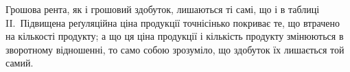 
Грошова рента, як і грошовий здобуток, лишаються ті самі, що і в таблиці II.~Підвищена реґуляційна ціна продукції точнісінько покриває те, що втрачено
на кількості продукту; а що ця ціна продукції і кількість продукту змінюються
в зворотному відношенні, то само собою зрозуміло, що здобуток їх лишається
той самий.
